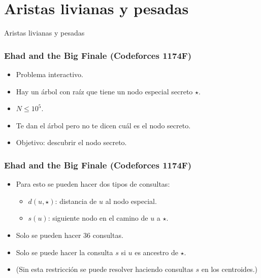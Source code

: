 \section{Aristas livianas y pesadas}

\begin{frame}
  \centering
  \Huge Aristas livianas y pesadas
\end{frame}

\begin{frame}
  \frametitle{Ehad and the Big Finale (Codeforces 1174F)}

  \begin{itemize}
    \item Problema interactivo.
    \item Hay un árbol con raíz que tiene un nodo especial secreto \(\star\).
    \item \(N \le 10^5\).
    \item Te dan el árbol pero no te dicen cuál es el nodo secreto.
    \item Objetivo: descubrir el nodo secreto.
  \end{itemize}
\end{frame}

\begin{frame}
  \frametitle{Ehad and the Big Finale (Codeforces 1174F)}

  \begin{itemize}
    \item Para esto se pueden hacer dos tipos de consultas:
    \begin{itemize}
      \item \(d(u, \star)\): distancia de \(u\) al nodo especial.
      \item \(s(u)\): siguiente nodo en el camino de \(u\) a \(\star\).
    \end{itemize}
    \item Solo se pueden hacer 36 consultas.
    \item Solo se puede hacer la consulta \(s\) si \(u\) es ancestro de \(\star\).
    \item (Sin esta restricción se puede resolver haciendo consultas \(s\) en los centroides.)
  \end{itemize}
\end{frame}
